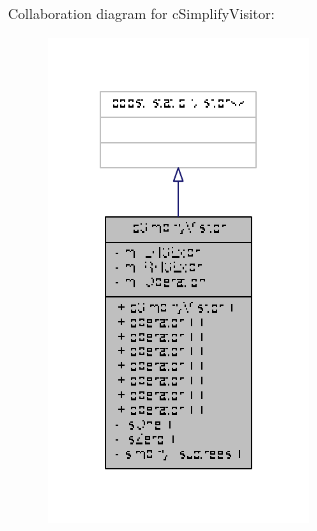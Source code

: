 Collaboration diagram for c\-Simplify\-Visitor\-:
\nopagebreak
\begin{figure}[H]
\begin{center}
\leavevmode
\includegraphics[width=196pt]{classcSimplifyVisitor__coll__graph}
\end{center}
\end{figure}
